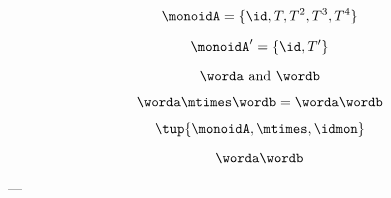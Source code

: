 {\begin{forslides}
        $$\monoidA = \{ \id, T, T^2, T^3, T^4 \}$$
        
        $$\monoidA' = \{ \id, T' \}$$
        
        \begin{equation*}
            \worda \text{ and } \wordb
        \end{equation*}
        
        \begin{equation*}
            \label{eq:string-semigroup-wordab-2}
            \worda \mtimes  \wordb =  \worda \wordb
        \end{equation*}
        
        
        $$ \tup{ \monoidA, \mtimes, \idmon} $$
        
        
        \begin{equation*}
            \label{eq:string-semigroup-wordab-concat-2}
            \worda \wordb
        \end{equation*}
        
        ---
        

\end{forslides}}
